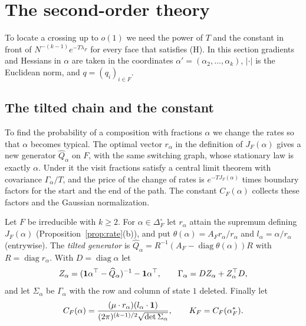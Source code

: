 \section{The second-order theory}\label{sec:secondorder}

To locate a crossing up to $o(1)$ we need the power of $T$ and the constant in front
of $N^{-(k-1)}e^{-T\lambda_F}$ for every face that satisfies (H). In this section
gradients and Hessians in $\alpha$ are taken in the coordinates
$\alpha'=(\alpha_2,\dots,\alpha_k)$, $|\cdot|$ is the Euclidean norm, and
$q=(q_i)_{i\in F}$.

\subsection{The tilted chain and the constant}\label{sec:tilt}

To find the probability of a composition with fractions $\alpha$ we change the
rates so that $\alpha$ becomes typical. The optimal vector $r_\alpha$ in the
definition of $J_F(\alpha)$ gives a new generator $\widehat Q_\alpha$ on $F$, with
the same switching graph, whose stationary law is exactly $\alpha$. Under it the
visit fractions satisfy a central limit theorem with covariance
$\Gamma_\alpha/T$, and the price of the change of rates is $e^{-TJ_F(\alpha)}$
times boundary factors for the start and the end of the path. The constant
$C_F(\alpha)$ collects these factors and the Gaussian normalization.

\begin{definition}\label{def:tilt}
Let $F$ be irreducible with $k\ge2$. For
$\alpha\in\Delta_F^\circ$ let $r_\alpha$ attain the supremum defining
$J_F(\alpha)$ (Proposition~\ref{prop:rate}(b)), and put
$\theta(\alpha)=A_Fr_\alpha/r_\alpha$ and $l_\alpha=\alpha/r_\alpha$
(entrywise). The \emph{tilted generator} is
$\widehat Q_\alpha=R^{-1}(A_F-\operatorname{diag}\theta(\alpha))R$ with
$R=\operatorname{diag}r_\alpha$. With $D=\operatorname{diag}\alpha$ let
\[
Z_\alpha=(\mathbf{1}\alpha^\top-\widehat Q_\alpha)^{-1}-\mathbf{1}\alpha^\top,
\qquad\Gamma_\alpha=DZ_\alpha+Z_\alpha^\top D,
\]
and let $\Sigma_\alpha$ be $\Gamma_\alpha$ with the row and column of state
$1$ deleted. Finally let
\[
C_F(\alpha)=\frac{(\mu\cdot r_\alpha)(l_\alpha\cdot\mathbf{1})}
{(2\pi)^{(k-1)/2}\sqrt{\det\Sigma_\alpha}},\qquad K_F=C_F(\alpha^*_F).
\]
\end{definition}

